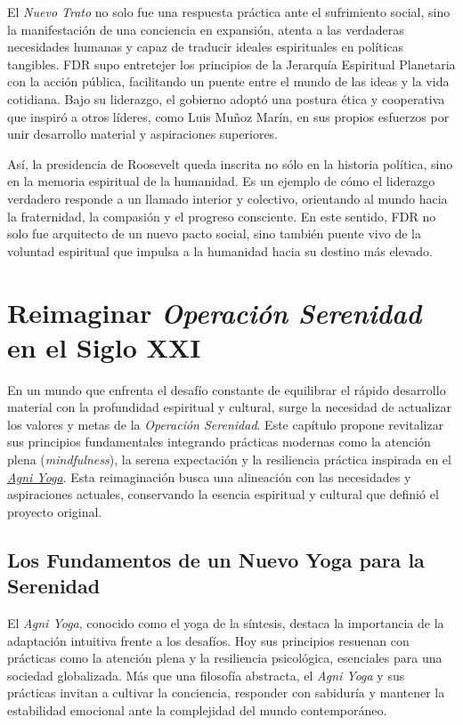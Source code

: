 \documentclass[
]{book}
\begin{document}
El \emph{Nuevo Trato} no solo fue una respuesta práctica ante el sufrimiento social, sino la manifestación de una conciencia en expansión, atenta a las verdaderas necesidades humanas y capaz de traducir ideales espirituales en políticas tangibles. FDR supo entretejer los principios de la Jerarquía Espiritual Planetaria con la acción pública, facilitando un puente entre el mundo de las ideas y la vida cotidiana. Bajo su liderazgo, el gobierno adoptó una postura ética y cooperativa que inspiró a otros líderes, como Luis Muñoz Marín, en sus propios esfuerzos por unir desarrollo material y aspiraciones superiores.

Así, la presidencia de Roosevelt queda inscrita no sólo en la historia política, sino en la memoria espiritual de la humanidad. Es un ejemplo de cómo el liderazgo verdadero responde a un llamado interior y colectivo, orientando al mundo hacia la fraternidad, la compasión y el progreso consciente. En este sentido, FDR no solo fue arquitecto de un nuevo pacto social, sino también puente vivo de la voluntad espiritual que impulsa a la humanidad hacia su destino más elevado.

\chapter{\texorpdfstring{Reimaginar \emph{Operación Serenidad} en el Siglo XXI}{Reimaginar Operación Serenidad en el Siglo XXI}}\label{reimaginar-operaciuxf3n-serenidad-en-el-siglo-xxi}

En un mundo que enfrenta el desafío constante de equilibrar el rápido desarrollo material con la profundidad espiritual y cultural, surge la necesidad de actualizar los valores y metas de la \emph{Operación Serenidad}. Este capítulo propone revitalizar sus principios fundamentales integrando prácticas modernas como la atención plena (\emph{mindfulness}), la serena expectación y la resiliencia práctica inspirada en el \href{https://agniyoga.info/}{\emph{Agni Yoga}}. Esta reimaginación busca una alineación con las necesidades y aspiraciones actuales, conservando la esencia espiritual y cultural que definió el proyecto original.

\section{Los Fundamentos de un Nuevo Yoga para la Serenidad}\label{los-fundamentos-de-un-nuevo-yoga-para-la-serenidad}

El \emph{Agni Yoga}, conocido como el yoga de la síntesis, destaca la importancia de la adaptación intuitiva frente a los desafíos. Hoy sus principios resuenan con prácticas como la atención plena y la resiliencia psicológica, esenciales para una sociedad globalizada. Más que una filosofía abstracta, el \emph{Agni Yoga} y sus prácticas invitan a cultivar la conciencia, responder con sabiduría y mantener la estabilidad emocional ante la complejidad del mundo contemporáneo.
\end{document}
